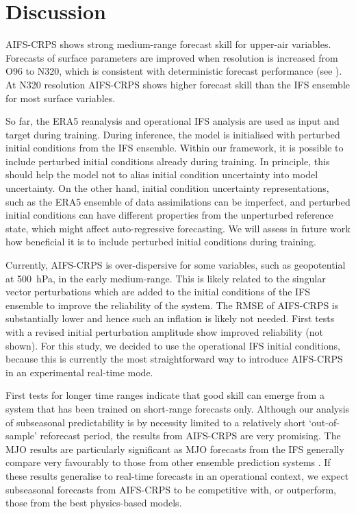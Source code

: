 \documentclass{article}
\begin{document}
\section{Discussion}
AIFS-CRPS shows strong medium-range forecast skill for upper-air variables. Forecasts of surface parameters are improved when resolution is increased from O96 to N320, which is consistent with deterministic forecast performance (see \cite{lang2024aifs}). At N320 resolution AIFS-CRPS shows higher forecast skill than the IFS ensemble for most surface variables.

So far, the ERA5 reanalysis and operational IFS analysis are used as input and target during training. During inference, the model is initialised with perturbed initial conditions from the IFS ensemble. Within our framework, it is possible to include perturbed initial conditions already during training. In principle, this should help the model not to alias initial condition uncertainty into model uncertainty. On the other hand, initial condition uncertainty representations, such as the ERA5 ensemble of data assimilations can be imperfect, and perturbed initial conditions can have different properties from the unperturbed reference state, which might affect auto-regressive forecasting. We will assess in future work how beneficial it is to include perturbed initial conditions during training. 

Currently, AIFS-CRPS is over-dispersive for some variables, such as geopotential at 500~hPa, in the early medium-range. This is likely related to the singular vector perturbations which are added to the initial conditions of the IFS ensemble to improve the reliability of the system. The RMSE of AIFS-CRPS is substantially lower and hence such an inflation is likely not needed. First tests with a revised initial perturbation amplitude show improved reliability (not shown). For this study, we decided to use the operational IFS initial conditions, because this is currently the most straightforward way to introduce AIFS-CRPS in an experimental real-time mode.

First tests for longer time ranges indicate that good skill can emerge from a system that has been trained on short-range forecasts only. Although our analysis of subseasonal predictability is by necessity limited to a relatively short `out-of-sample' reforecast period, the results from AIFS-CRPS are very promising. The MJO results are particularly significant as MJO forecasts from the IFS generally compare very favourably to those from other ensemble prediction systems \citep{vitart2017madden}. If these results generalise to real-time forecasts in an operational context, we expect subseasonal forecasts from AIFS-CRPS to be competitive with, or outperform, those from the best physics-based models. 
\end{document}

